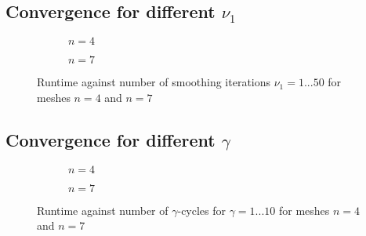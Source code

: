 \documentclass[11pt,a4paper]{article}
\begin{document}
\subsection{Convergence for different $\nu_1$}

\begin{figure}[h!]
	\centering
	\begin{subfigure}[h!]{.49\textwidth}
		\begin{center}
			\resizebox{0.52\width}{!}{}
			\caption{$n=4$}
			\label{fig::TimNu1}
		\end{center}	
	\end{subfigure}
	\hfill
	\begin{subfigure}[h!]{.49\textwidth}
		\centering
		\resizebox{0.52\width}{!}{}
		\caption{$n=7$}
		\label{fig::TimNu2}
	\end{subfigure}
	\label{fig::TimNu}
	\caption{Runtime against number of smoothing iterations $\nu_1 = 1...50 $ for meshes $n=4$ and $n=7$ }
\end{figure}


\subsection{Convergence for different $\gamma$}

\begin{figure}[h!]
	\centering
	\begin{subfigure}[h!]{.49\textwidth}
		\begin{center}
			\resizebox{0.52\width}{!}{}
			\caption{$n=4$}
			\label{fig::TimGamma1}
		\end{center}	
	\end{subfigure}
	\hfill
	\begin{subfigure}[h!]{.49\textwidth}
		\centering
		\resizebox{0.52\width}{!}{}
		\caption{$n=7$}
		\label{fig::TimGamma2}
	\end{subfigure}
	\label{fig::TimGamma}
	\caption{Runtime against number of $\gamma$-cycles for $\gamma = 1...10 $ for meshes $n=4$ and $n=7$ }
\end{figure}




%
%
\end{document}
